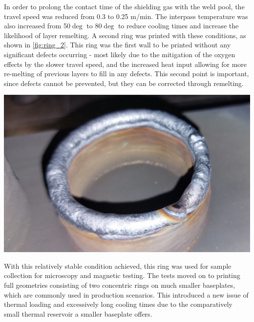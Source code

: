 In order to prolong the contact time of the shielding gas with the weld pool, the travel speed was reduced from 0.3 to 0.25 m/min. The interpass temperature was also increased from 50$\deg$ to 80$\deg$ to reduce cooling times and increase the likelihood of layer remelting. A second ring was printed with these conditions, as shown in \autoref{fig:ring_2}.
This ring was the first wall to be printed without any significant defects occurring - most likely due to the mitigation of the oxygen effects by the slower travel speed, and the increased heat input allowing for more re-melting of previous layers to fill in any defects. This second point is important, since defects cannot be prevented, but they can be corrected through remelting.

\begin{minipage}{\linewidth}
    \centering
    \includegraphics[width=\linewidth]{images/ring_2.jpg}
    \label{fig:ring_2}
\end{minipage}

With this relatively stable condition achieved, this ring was used for sample collection for microscopy and magnetic testing. The tests moved on to printing full geometries consisting of two concentric rings on much smaller baseplates, which are commonly used in production scenarios. This introduced a new issue of thermal loading and excessively long cooling times due to the comparatively small thermal reservoir a smaller baseplate offers.

